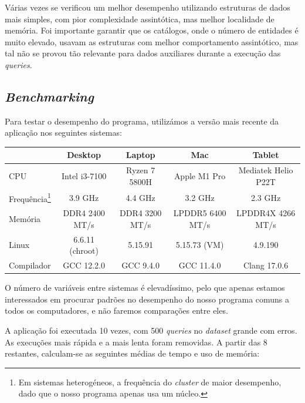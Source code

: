 \documentclass[11pt, a4paper]{article}
\begin{document}
Várias vezes se verificou um melhor desempenho utilizando estruturas de dados mais simples, com pior
complexidade assintótica, mas melhor localidade de memória. Foi importante garantir que os
catálogos, onde o número de entidades é muito elevado, usavam as estruturas com melhor comportamento
assintótico, mas tal não se provou tão relevante para dados auxiliares durante a execução das
\emph{queries}.

\subsection{\emph{Benchmarking}}
\label{sec:benchmarking}

Para testar o desempenho do programa, utilizámos a versão mais recente da aplicação nos seguintes
sistemas:

\begin{adjustwidth}{-1.5cm}{-1.5cm}
    \begin{center}
        \begin{tabular}{|l|c|c|c|c|}
            \hline
            & Desktop & Laptop & Mac & Tablet \\
            \hline
            CPU & Intel i3-7100 & Ryzen 7 5800H & Apple M1 Pro & Mediatek Helio P22T \\
            \hline
            Frequência\footnote{Em sistemas heterogéneos, a frequência do \emph{cluster} de maior
                                desempenho, dado que o nosso programa apenas usa um núcleo.} &
            3.9 GHz & 4.4 GHz & 3.2 GHz & 2.3 GHz \\
            \hline
            Memória & DDR4 2400 MT/s & DDR4 3200 MT/s & LPDDR5 6400 MT/s & LPDDR4X 4266 MT/s \\
            \hline
            Linux & 6.6.11 (chroot) & 5.15.91 & 5.15.73 (VM) & 4.9.190 \\
            \hline
            Compilador & GCC 12.2.0 & GCC 9.4.0 & GCC 11.4.0 & Clang 17.0.6 \\
            \hline
        \end{tabular}
    \end{center}
\end{adjustwidth}

O número de variáveis entre sistemas é elevadíssimo, pelo que apenas estamos interessados em
procurar padrões no desempenho do nosso programa comuns a todos os computadores, e não faremos
comparações entre eles.

A aplicação foi executada 10 vezes, com 500 \emph{queries} no \emph{dataset} grande com erros. As
execuções mais rápida e a mais lenta foram removidas. A partir das 8 restantes, calculam-se as
seguintes médias de tempo e uso de memória:
\end{document}
